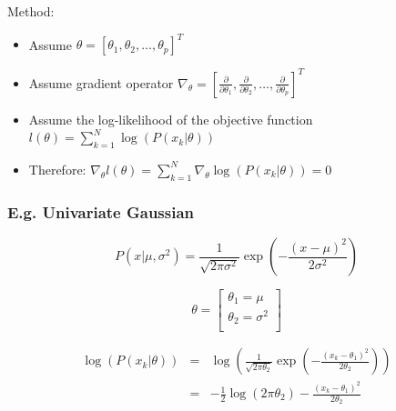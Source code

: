 \documentclass[letterpaper,10pt]{article}
\begin{document}
Method:
\begin{itemize}
	\item Assume $\theta=[\theta_1,\theta_2,\dots,\theta_p]^T$
	\item Assume gradient operator $\nabla_\theta=[\frac{\partial}{\partial\theta_1},\frac{\partial}{\partial\theta_2},\dots,\frac{\partial}{\partial\theta_p}]^T$
	\item Assume the log-likelihood of the objective function $l(\theta)=\sum_{k=1}^{N}{\log(P(x_k|\theta))}$
	\item Therefore: $\nabla_\theta l(\theta)=\sum_{k=1}^{N}{\nabla_\theta \log(P(x_k|\theta))}=0$
\end{itemize}

\subsubsection{E.g. Univariate Gaussian}

\begin{equation}
P(x|\mu,\sigma^2)=\frac{1}{\sqrt{2\pi\sigma^2}}\exp(-\frac{(x-\mu)^2}{2\sigma^2})
\end{equation}

\begin{equation}
\theta=\left[\begin{array}{c}
\theta_1=\mu \\
\theta_2=\sigma^2 \\
\end{array}\right]
\end{equation}

\begin{equation}
\begin{array}{rcl}
\log(P(x_k|\theta)) & = & \log(\frac{1}{\sqrt{2\pi\theta_2}}\exp(-\frac{(x_k-\theta_1)^2}{2\theta_2})) \\
                   & = & -\frac{1}{2}\log(2\pi\theta_2)-\frac{(x_k-\theta_1)^2}{2\theta_2} \\
\end{array}
\end{equation}
\end{document}
